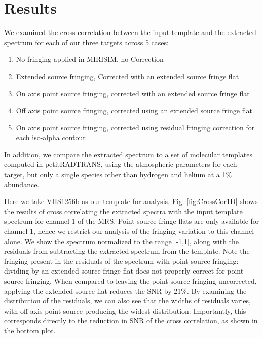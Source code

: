 \section{Results}
We examined the cross correlation between the input template and the extracted spectrum for each of our three targets across 5 cases:
\begin{enumerate}
	\item No fringing applied in MIRISIM, no Correction
	\item Extended source fringing, Corrected with an extended source fringe flat
	\item On axis point source fringing, corrected with an extended source fringe flat
	\item Off axis point source fringing, corrected using an extended source fringe flat.
	\item On axis point source fringing, corrected using residual fringing correction for each iso-alpha contour
\end{enumerate}
In addition, we compare the extracted spectrum to a set of molecular templates computed in petitRADTRANS, using the atmospheric parameters for each target, but only a single species other than hydrogen and helium at a 1\% abundance.

Here we take VHS1256b as our template for analysis.
Fig. \ref{fig:CrossCor1D} shows the results of cross correlating the extracted spectra with the input template spectrum for channel 1 of the MRS.
Point source fringe flats are only available for channel 1, hence we restrict our analysis of the fringing variation to this channel alone.
We show the spectrum normalized to the range [-1,1], along with the residuals from subtracting the extracted spectrum from the template.
Note the fringing present in the residuals of the spectrum with point source fringing: dividing by an extended source fringe flat does not properly correct for point source fringing.
When compared to leaving the point source fringing uncorrected, applying the extended source flat reduces the SNR by 21\%.
By examining the distribution of the residuals, we can also see that the widths of residuals varies, with off axis point source producing the widest distribution.
Importantly, this corresponds directly to the reduction in SNR of the cross correlation, as shown in the bottom plot. 

